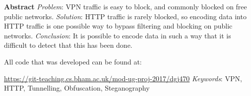 {\huge\textbf{Abstract}}
\vspace{0.7cm}
\newline
\textit{Problem}: VPN traffic is easy to block, and commonly blocked on free public networks.
\vspace{0.4cm}
\newline
\textit{Solution}: HTTP traffic is rarely blocked, so encoding data into HTTP traffic is one possible way to bypass filtering and blocking on public networks.
\vspace{0.4cm}
\newline
\textit{Conclusion}: It is possible to encode data in such a way that it is difficult to detect that this has been done.\par
\vspace{0.4cm}
All code that was developed can be found at:\par
\url{https://git-teaching.cs.bham.ac.uk/mod-ug-proj-2017/dgj470}
\vspace{0.5cm}
\newline
\textit{Keywords}: VPN, HTTP, Tunnelling, Obfuscation, Steganography

